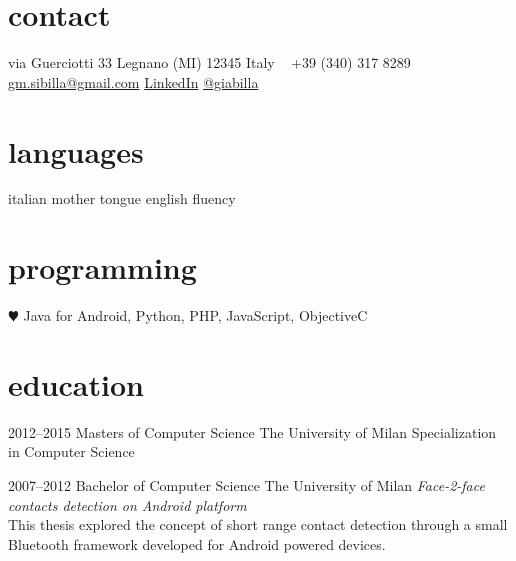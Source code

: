 \documentclass[]{friggeri-cv} %
\begin{document}


\begin{aside} %
\section{contact}
via Guerciotti 33
Legnano (MI) 12345
Italy
~
+39 (340) 317 8289
~
\href{mailto:gm.sibilla@gmail.com}{gm.sibilla@gmail.com}
\href{https://it.linkedin.com/in/gmbilla}{LinkedIn}
\href{https://twitter.com/giabilla}{@giabilla}
\section{languages}
italian mother tongue
english fluency
\section{programming}
{\color{red} $\varheartsuit$} Java for Android, Python, PHP, JavaScript, ObjectiveC
\end{aside}


\section{education}

\begin{entrylist}


\entry
{2012--2015}
{Masters {\normalfont of Computer Science}}
{The University of Milan}
{Specialization in Computer Science}


\entry
{2007--2012}
{Bachelor {\normalfont of Computer Science}}
{The University of Milan}
{\emph{Face-2-face contacts detection on Android platform} \\ This thesis explored the concept of short range contact detection through a small Bluetooth framework developed for Android powered devices.}


\end{entrylist}
\end{document}
